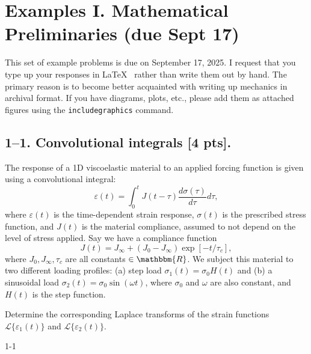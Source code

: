 

\section*{Examples I. Mathematical Preliminaries (due Sept 17)}
\label{PS1}

This set of example problems is due on September 17, 2025. 
I request that you type up your responses in \LaTeX~ rather than write them out by hand. 
The primary reason is to become better acquainted with writing up mechanics in archival format. 
If you have diagrams, plots, etc., please add them as attached figures using the \texttt{includegraphics} command. 

\bigskip
\subsection*{1--1. \textbf{Convolutional integrals} [4 pts].} The response of a 1D viscoelastic material to an applied forcing function is given using a convolutional integral:
\begin{equation}
    \varepsilon(t) = \int_0^t J(t-\tau) \frac{d\sigma(\tau)}{d\tau} d\tau,
\end{equation}
where $\varepsilon(t)$ is the time-dependent strain response, $\sigma(t)$ is the prescribed stress function, and $J(t)$ is the material compliance, assumed to not depend on the level of stress applied. 
Say we have a compliance function 
\begin{equation}
    J(t) = J_\infty + (J_0-J_\infty)\exp[-t/\tau_c],
\end{equation}
where $J_0, J_\infty, \tau_c$ are all constants $\in \mathbbm{R}$. 
We subject this material to two different loading profiles: (a) step load $\sigma_1(t) = \sigma_0 H(t)$ and (b) a sinusoidal load $\sigma_2(t) = \sigma_0  \sin(\omega t)$, where $\sigma_0$ and $\omega$ are also constant, and $H(t)$ is the step function. 

Determine the corresponding Laplace transforms of the strain functions $\mathcal{L}\{\varepsilon_1(t)\}$ and $\mathcal{L}\{\varepsilon_2(t)\}$. 

1-1
